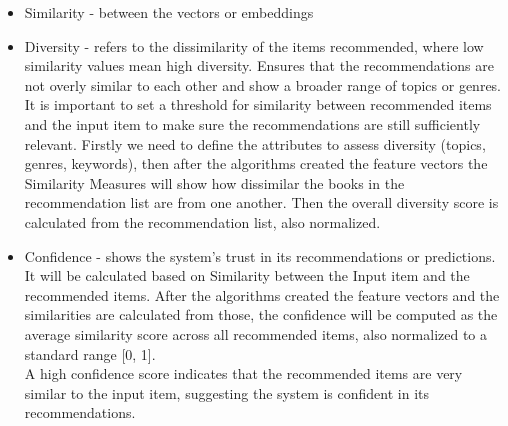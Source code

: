 \documentclass[\myFontSize,oneside,english,hidelinks,a4paper]{article}
\begin{document}
\begin{itemize}

\item Similarity - between the vectors or embeddings



\item Diversity - refers to the dissimilarity of the items recommended, where low similarity values mean high diversity. Ensures that the recommendations are not overly similar to each other and show a broader range of topics or genres. It is important to set a threshold for similarity between recommended items and the input item to make sure the recommendations are still sufficiently relevant. Firstly we need to define the attributes to assess diversity (topics, genres, keywords), then after the algorithms created the feature vectors the Similarity Measures will show how dissimilar the books in the recommendation list are from one another. Then the overall diversity score is calculated from the recommendation list, also normalized.

\item Confidence - shows the system's trust in its recommendations or predictions. It will be calculated based on Similarity between the Input item and the recommended items. After the algorithms created the feature vectors and the similarities are calculated from those, the confidence will be computed as the average similarity score across all recommended items, also normalized to a standard range [0, 1].\\
A high confidence score indicates that the recommended items are very similar to the input item, suggesting the system is confident in its recommendations.


\end{itemize}
\end{document}
